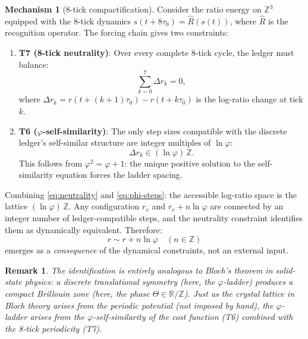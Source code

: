 \documentclass[11pt]{article}
\newtheorem{remark}{Remark}
\theoremstyle{definition}
\newtheorem{mechanism}{Mechanism}
\newcommand{\phig}{\varphi}
\begin{document}
\begin{mechanism}[8-tick compactification]
Consider the ratio energy on $\mathbb{Z}^3$ equipped with the 8-tick dynamics $s(t + 8\tau_0) = \hat{R}(s(t))$, where $\hat{R}$ is the recognition operator. The forcing chain gives two constraints:
\begin{enumerate}[nosep]
\item \textbf{T7 (8-tick neutrality)}: Over every complete 8-tick cycle, the ledger must balance:
\begin{equation}
\sum_{k=0}^{7} \Delta r_k = 0,
\label{eq:neutrality}
\end{equation}
where $\Delta r_k = r(t + (k+1)\tau_0) - r(t + k\tau_0)$ is the log-ratio change at tick $k$.
\item \textbf{T6 ($\phig$-self-similarity)}: The only step sizes compatible with the discrete ledger's self-similar structure are integer multiples of $\ln\phig$:
\begin{equation}
\Delta r_k \in (\ln\phig)\,\mathbb{Z}.
\label{eq:phi-steps}
\end{equation}
This follows from $\phig^2 = \phig + 1$: the unique positive solution to the self-similarity equation forces the ladder spacing.
\end{enumerate}

Combining \eqref{eq:neutrality} and \eqref{eq:phi-steps}: the accessible log-ratio space is the lattice $(\ln\phig)\,\mathbb{Z}$. Any configuration $r_v$ and $r_v + n\ln\phig$ are connected by an integer number of ledger-compatible steps, and the neutrality constraint identifies them as dynamically equivalent. Therefore:
\begin{equation}
\boxed{r \sim r + n\ln\phig \quad (n \in \mathbb{Z})}
\end{equation}
emerges as a \emph{consequence} of the dynamical constraints, not an external input.
\end{mechanism}

\begin{remark}
The identification is entirely analogous to Bloch's theorem in solid-state physics: a discrete translational symmetry (here, the $\phig$-ladder) produces a compact Brillouin zone (here, the phase $\Theta \in \mathbb{R}/\mathbb{Z}$). Just as the crystal lattice in Bloch theory arises from the periodic potential (not imposed by hand), the $\phig$-ladder arises from the $\phig$-self-similarity of the cost function (T6) combined with the 8-tick periodicity (T7).
\end{remark}
\end{document}
